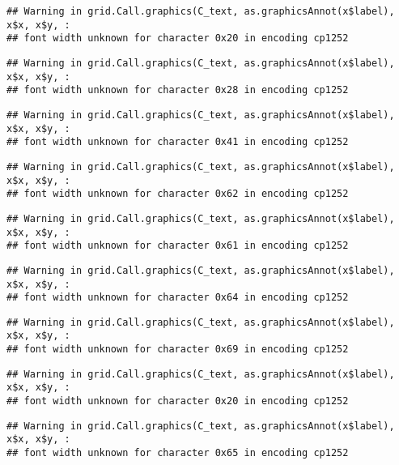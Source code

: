 \documentclass[
]{article}
\begin{document}
\begin{verbatim}
## Warning in grid.Call.graphics(C_text, as.graphicsAnnot(x$label), x$x, x$y, :
## font width unknown for character 0x20 in encoding cp1252
\end{verbatim}

\begin{verbatim}
## Warning in grid.Call.graphics(C_text, as.graphicsAnnot(x$label), x$x, x$y, :
## font width unknown for character 0x28 in encoding cp1252
\end{verbatim}

\begin{verbatim}
## Warning in grid.Call.graphics(C_text, as.graphicsAnnot(x$label), x$x, x$y, :
## font width unknown for character 0x41 in encoding cp1252
\end{verbatim}

\begin{verbatim}
## Warning in grid.Call.graphics(C_text, as.graphicsAnnot(x$label), x$x, x$y, :
## font width unknown for character 0x62 in encoding cp1252
\end{verbatim}

\begin{verbatim}
## Warning in grid.Call.graphics(C_text, as.graphicsAnnot(x$label), x$x, x$y, :
## font width unknown for character 0x61 in encoding cp1252
\end{verbatim}

\begin{verbatim}
## Warning in grid.Call.graphics(C_text, as.graphicsAnnot(x$label), x$x, x$y, :
## font width unknown for character 0x64 in encoding cp1252
\end{verbatim}

\begin{verbatim}
## Warning in grid.Call.graphics(C_text, as.graphicsAnnot(x$label), x$x, x$y, :
## font width unknown for character 0x69 in encoding cp1252
\end{verbatim}

\begin{verbatim}
## Warning in grid.Call.graphics(C_text, as.graphicsAnnot(x$label), x$x, x$y, :
## font width unknown for character 0x20 in encoding cp1252
\end{verbatim}

\begin{verbatim}
## Warning in grid.Call.graphics(C_text, as.graphicsAnnot(x$label), x$x, x$y, :
## font width unknown for character 0x65 in encoding cp1252
\end{verbatim}
\end{document}
